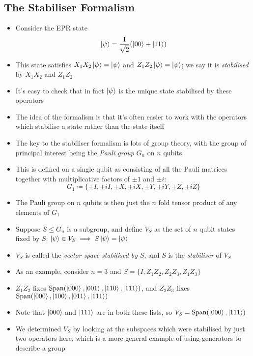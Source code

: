 \documentclass[12pt,a4paper]{article}
\numberwithin{equation}{section}
\begin{document}
	\subsection{The Stabiliser Formalism}
	\begin{itemize}
		\item Consider the EPR state
		\begin{equation}
			\ket{\psi}=\frac{1}{\sqrt{2}}(\ket{00}+\ket{11})
		\end{equation}
		\item This state satisfies $X_{1}X_{2}\ket{\psi}=\ket{\psi}$ and $Z_{1}Z_{2}\ket{\psi}=\ket{\psi}$; we say it is \textit{stabilised} by $X_{1}X_{2}$ and $Z_{1}Z_{2}$
		\item It's easy to check that in fact $\ket{\psi}$ is the unique state stabilised by these operators
		\item The idea of the formalism is that it's often easier to work with the operators which stabilise a state rather than the state itself
		\item The key to the stabiliser formalism is lots of group theory, with the group of principal interest being the \textit{Pauli group} $G_{n}$ on $n$ qubits
		\item This is defined on a single qubit as consisting of all the Pauli matrices together with multiplicative factors of $\pm 1$ and $\pm i$:
		\begin{equation}
			G_{1}\coloneqq\{\pm I,\pm iI, \pm X, \pm iX, \pm Y, \pm iY, \pm Z, \pm iZ\}
		\end{equation}
		\item The Pauli group on $n$ qubits is then just the $n$ fold tensor product of any elements of $G_{1}$
		\item Suppose $S\leq G_{n}$ is a subgroup, and define $V_{S}$ as the set of $n$ qubit states fixed by $S$: $\ket{\psi}\in V_{S} \implies S\ket{\psi}=\ket{\psi}$
		\item $V_{S}$ is called the \textit{vector space stabilised by} $S$, and $S$ is the \textit{stabiliser} of $V_{S}$
		\item As an example, consider $n=3$ and $S=\{I,Z_{1}Z_{2},Z_{2}Z_{3},Z_{1}Z_{3}\}$
		\item $Z_{1}Z_{2}$ fixes $\text{Span}(\ket{000},\ket{001},\ket{110},\ket{111})$, and $Z_{2}Z_{3}$ fixes $\text{Span}(\ket{000},\ket{100},\ket{011},\ket{111})$
		\item Note that $\ket{000}$ and $\ket{111}$ are in both these lists, so $V_{S}=\text{Span}(\ket{000},\ket{111})$
		\item We determined $V_{S}$ by looking at the subspaces which were stabilised by just two operators here, which is a more general example of using generators to describe a group

\end{itemize}
\end{document}
